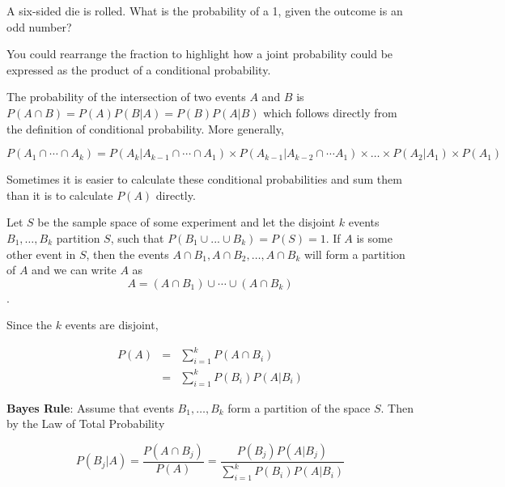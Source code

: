 \documentclass[
]{book}
\begin{document}
\begin{example}
\protect\hypertarget{exm:condprobexm2}{}\label{exm:condprobexm2}A six-sided die is rolled. What is the probability of a 1, given the outcome is an odd number?
\end{example}

You could rearrange the fraction to highlight how a joint probability could be expressed as the product of a conditional probability.

\begin{definition}
\protect\hypertarget{def:unnamed-chunk-68}{}\label{def:unnamed-chunk-68}The probability of the intersection of two events \(A\) and \(B\) is \(P(A\cap B)=P(A)P(B|A)=P(B)P(A|B)\) which follows directly from the definition of conditional probability. More generally,

\[P(A_1\cap \cdots\cap A_k) = P(A_k| A_{k-1}\cap \cdots \cap A_1)\times P(A_{k-1}|A_{k-2}\cap \cdots A_1) \times \ldots \times P(A_2|A_1)\times P(A_1)\]

Sometimes it is easier to calculate these conditional probabilities and sum them than it is to calculate \(P(A)\) directly.
\end{definition}

\begin{definition}
\protect\hypertarget{def:unnamed-chunk-69}{}\label{def:unnamed-chunk-69}Let \(S\) be the sample space of some experiment and let the disjoint \(k\) events \(B_1,\ldots,B_k\) partition \(S\), such that \(P(B_1\cup ... \cup B_k) = P(S) = 1\). If \(A\) is some other event in \(S\), then the events \(A\cap B_1, A\cap B_2, \ldots, A\cap B_k\) will form a partition of \(A\) and we can write \(A\) as \[A=(A\cap B_1)\cup\cdots\cup (A\cap B_k)\].

Since the \(k\) events are disjoint,

\begin{eqnarray*}
P(A)&=&\sum\limits_{i=1}^k P(A \cap B_i)\\
      &=&\sum\limits_{i=1}^k P(B_i)P(A|B_i)
\end{eqnarray*}
\end{definition}

\textbf{Bayes Rule}: Assume that events \(B_1,\ldots,B_k\) form a partition of the space \(S\). Then by the Law of Total Probability

\[P(B_j|A)= \frac{P(A \cap B_j)} {P(A)} = \frac{P(B_j) P(A|B_j)}{\sum\limits_{i=1}^k P(B_i)P(A|B_i)}\]
\end{document}
